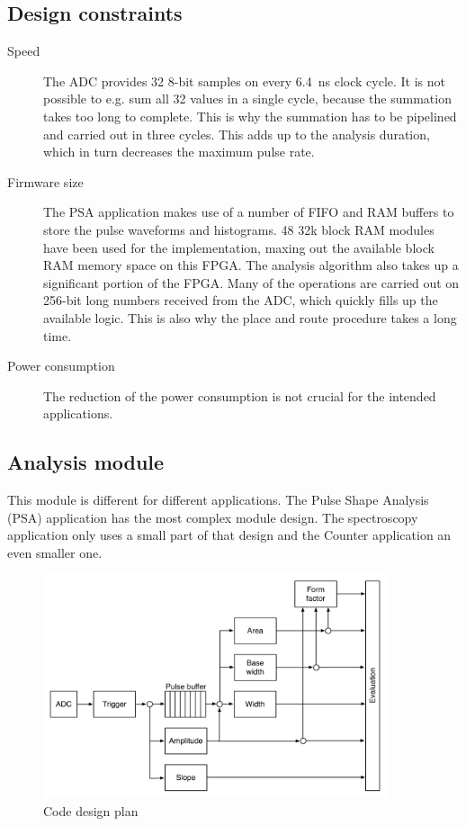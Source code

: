 \subsection{Design constraints}
\begin{description}
\item[Speed] The ADC provides 32 8-bit samples on every 6.4~ns clock cycle. It is not possible to e.g. sum all 32 values in a single cycle, because the summation takes too long to complete. This is why the summation has to be pipelined and carried out in three cycles. This adds up to the analysis duration, which in turn decreases the maximum pulse rate.
\item[Firmware size] The PSA application makes use of a number of FIFO and RAM buffers to store the pulse waveforms and histograms. 48 32k block RAM modules have been used for the implementation, maxing out the available block RAM memory space on this FPGA. The analysis algorithm also takes up a significant portion of the FPGA. Many of the operations are carried out on 256-bit long numbers received from the ADC, which quickly fills up the available logic. This is also why the place and route procedure takes a long time.
\item[Power consumption] The reduction of the power consumption is not crucial for the intended applications.
\end{description}


\subsection{Analysis module}
\label{subsec:algorithm}
This module is different for different applications. The Pulse Shape Analysis (PSA) application has the most complex module design. The spectroscopy application only uses a small part of that design and the Counter application an even smaller one.


\begin{figure}[!t]
\centering
\includegraphics[width=0.9\textwidth]{05_current_monitoring/plots/analysis1}
\caption{Code design plan}
\label{fig:architecture}
\end{figure}

